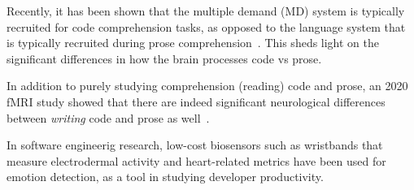     Recently, it has been shown that the multiple demand (MD) system is typically recruited for code comprehension tasks, as opposed to the language system that is typically recruited during prose comprehension~\cite{ivanova_comprehension_2020}. This sheds light on the significant differences in how the brain processes code vs prose.

    In addition to purely studying comprehension (reading) code and prose, an 2020 fMRI study showed that there are indeed significant neurological differences between \emph{writing} code and prose as well~\cite{noauthor_neurological_nodate}.

    In software engineerig research, low-cost biosensors such as wristbands that measure electrodermal activity and heart-related metrics have been used for emotion detection, as a tool in studying developer productivity.

